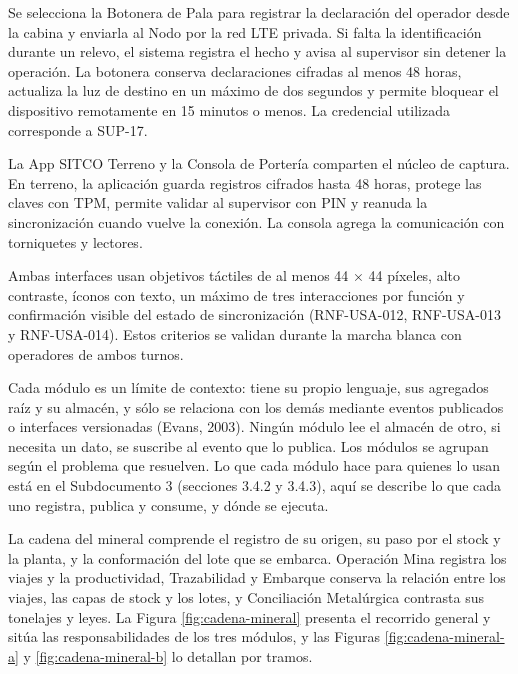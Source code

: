 \documentclass[subdoc]{../../comun/overfore}
\begin{document}
Se selecciona la Botonera de Pala para registrar la declaración del operador desde la cabina y enviarla al Nodo por la red LTE privada. Si falta la identificación durante un relevo, el sistema registra el hecho y avisa al supervisor sin detener la operación. La botonera conserva declaraciones cifradas al menos 48 horas, actualiza la luz de destino en un máximo de dos segundos y permite bloquear el dispositivo remotamente en 15 minutos o menos. La credencial utilizada corresponde a SUP-17.

La App SITCO Terreno y la Consola de Portería comparten el núcleo de captura. En terreno, la aplicación guarda registros cifrados hasta 48 horas, protege las claves con TPM, permite validar al supervisor con PIN y reanuda la sincronización cuando vuelve la conexión. La consola agrega la comunicación con torniquetes y lectores.

Ambas interfaces usan objetivos táctiles de al menos 44 × 44 píxeles, alto contraste, íconos con texto, un máximo de tres interacciones por función y confirmación visible del estado de sincronización (RNF-USA-012, RNF-USA-013 y RNF-USA-014). Estos criterios se validan durante la marcha blanca con operadores de ambos turnos.

Cada módulo es un límite de contexto: tiene su propio lenguaje, sus agregados raíz y su almacén, y sólo se relaciona con los demás mediante eventos publicados o interfaces versionadas (Evans, 2003). Ningún módulo lee el almacén de otro, si necesita un dato, se suscribe al evento que lo publica. Los módulos se agrupan según el problema que resuelven. Lo que cada módulo hace para quienes lo usan está en el Subdocumento 3 (secciones 3.4.2 y 3.4.3), aquí se describe lo que cada uno registra, publica y consume, y dónde se ejecuta.

La cadena del mineral comprende el registro de su origen, su paso por el stock y la planta, y la conformación del lote que se embarca. Operación Mina registra los viajes y la productividad, Trazabilidad y Embarque conserva la relación entre los viajes, las capas de stock y los lotes, y Conciliación Metalúrgica contrasta sus tonelajes y leyes. La Figura \ref{fig:cadena-mineral} presenta el recorrido general y sitúa las responsabilidades de los tres módulos, y las Figuras \ref{fig:cadena-mineral-a} y \ref{fig:cadena-mineral-b} lo detallan por tramos.
\end{document}
